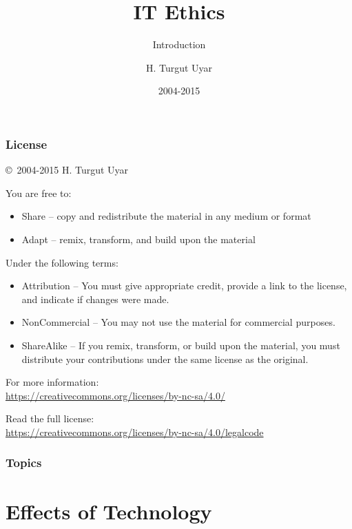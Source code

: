 \documentclass[dvipsnames]{beamer}
\title{IT Ethics}
\subtitle{Introduction}
\author{H. Turgut Uyar}
\date{2004-2015}
\theoremstyle{plain}
\begin{document}
\begin{frame}
  \titlepage
\end{frame}

\begin{frame}
  \frametitle{License}

  \hfill
  \copyright~2004-2015 H. Turgut Uyar

  \vfill
  \begin{footnotesize}
    You are free to:
    \begin{itemize}
      \itemsep0em
      \item Share -- copy and redistribute the material in any medium or format
      \item Adapt -- remix, transform, and build upon the material
    \end{itemize}

    Under the following terms:
    \begin{itemize}
      \itemsep0em
      \item Attribution -- You must give appropriate credit, provide a link to
        the license, and indicate if changes were made.

      \item NonCommercial -- You may not use the material for commercial
        purposes.

      \item ShareAlike -- If you remix, transform, or build upon the material,
        you must distribute your contributions under the same license as the
        original.
    \end{itemize}
  \end{footnotesize}

  \begin{small}
    For more information:\\
    \url{https://creativecommons.org/licenses/by-nc-sa/4.0/}

    \smallskip
    Read the full license:\\
    \url{https://creativecommons.org/licenses/by-nc-sa/4.0/legalcode}
  \end{small}
\end{frame}

\begin{frame}
  \frametitle{Topics}
  \tableofcontents
\end{frame}

\section{Effects of Technology}
\end{document}
